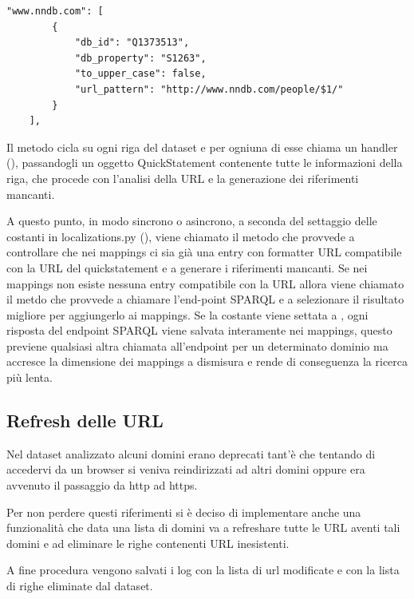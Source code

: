 \begin{lstlisting}[style=jsonStyle, caption=Some Code]
    "www.nndb.com": [
        {
            "db_id": "Q1373513", 
            "db_property": "S1263", 
            "to_upper_case": false, 
            "url_pattern": "http://www.nndb.com/people/$1/"
        }
    ], 
\end{lstlisting}

Il metodo  cicla su ogni riga del dataset e per ogniuna di esse chiama un handler (), passandogli un oggetto 
QuickStatement contenente tutte le informazioni della riga, che procede con l'analisi della URL e la generazione dei riferimenti mancanti.

A questo punto, in modo sincrono o asincrono, a seconda del settaggio delle costanti in localizations.py (), 
viene chiamato il metodo  che provvede a controllare che nei mappings ci sia già una entry con formatter URL compatibile 
con la URL del quickstatement e a generare i riferimenti mancanti.
Se nei mappings non esiste nessuna entry compatibile con la URL allora viene chiamato il metdo  che provvede a chiamare l'end-point SPARQL 
e a selezionare il risultato migliore per aggiungerlo ai mappings. 
Se la costante  viene settata a , ogni risposta del endpoint SPARQL viene salvata interamente nei mappings, questo previene qualsiasi altra chiamata all'endpoint 
per un determinato dominio ma accresce la dimensione dei mappings a dismisura e rende di conseguenza la ricerca più lenta.
 
\subsection{Refresh delle URL}
Nel dataset analizzato alcuni domini erano deprecati tant'è che tentando di accedervi da un browser si veniva reindirizzati ad altri domini oppure era avvenuto il passaggio da http ad https.

Per non perdere questi riferimenti si è deciso di implementare anche una funzionalità che data una lista di domini va a refreshare tutte le URL aventi tali domini e ad eliminare le 
righe contenenti URL inesistenti.

A fine procedura vengono salvati i log con la lista di url modificate e con la lista di righe eliminate dal dataset.

